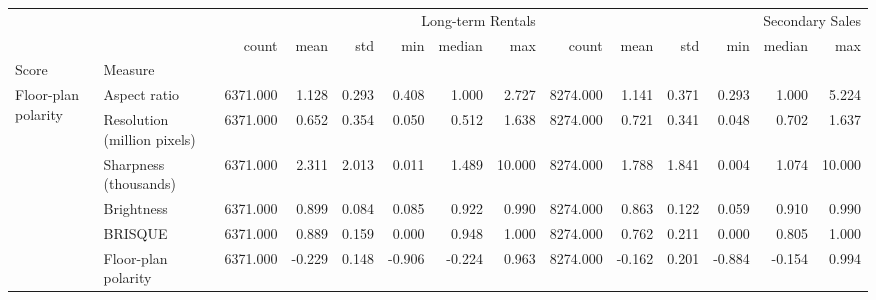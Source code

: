 \begin{tabular}{llrrrrrrrrrrrr}
\toprule
 &  & \multicolumn{6}{r}{Long-term Rentals} & \multicolumn{6}{r}{Secondary Sales} \\
 &  & count & mean & std & min & median & max & count & mean & std & min & median & max \\
Score & Measure &  &  &  &  &  &  &  &  &  &  &  &  \\
\midrule
\multirow[t]{6}{*}{Floor-plan polarity} & Aspect ratio & 6371.000 & 1.128 & 0.293 & 0.408 & 1.000 & 2.727 & 8274.000 & 1.141 & 0.371 & 0.293 & 1.000 & 5.224 \\
 & Resolution (million pixels) & 6371.000 & 0.652 & 0.354 & 0.050 & 0.512 & 1.638 & 8274.000 & 0.721 & 0.341 & 0.048 & 0.702 & 1.637 \\
 & Sharpness (thousands) & 6371.000 & 2.311 & 2.013 & 0.011 & 1.489 & 10.000 & 8274.000 & 1.788 & 1.841 & 0.004 & 1.074 & 10.000 \\
 & Brightness & 6371.000 & 0.899 & 0.084 & 0.085 & 0.922 & 0.990 & 8274.000 & 0.863 & 0.122 & 0.059 & 0.910 & 0.990 \\
 & BRISQUE & 6371.000 & 0.889 & 0.159 & 0.000 & 0.948 & 1.000 & 8274.000 & 0.762 & 0.211 & 0.000 & 0.805 & 1.000 \\
 & Floor-plan polarity & 6371.000 & -0.229 & 0.148 & -0.906 & -0.224 & 0.963 & 8274.000 & -0.162 & 0.201 & -0.884 & -0.154 & 0.994 \\
\cline{1-14}
\bottomrule
\end{tabular}
